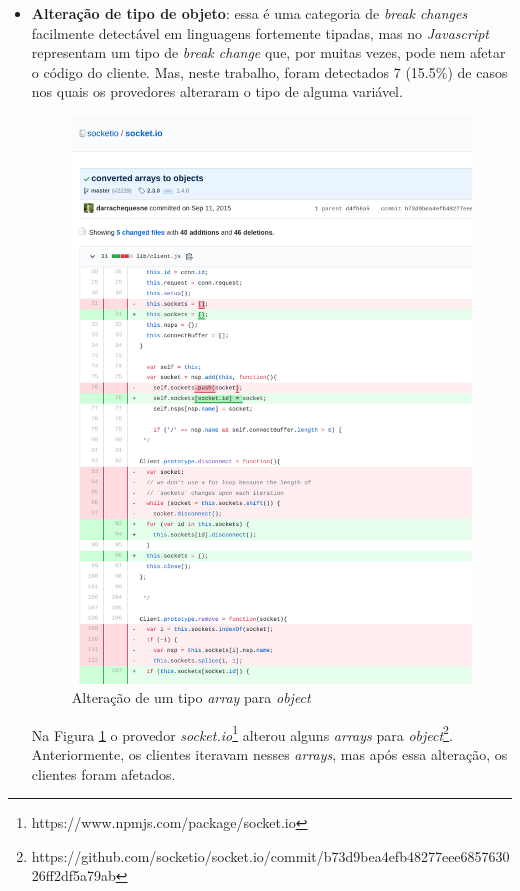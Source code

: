 \begin{itemize}
    \item \textbf{Alteração de tipo de objeto}: essa é uma categoria de \textit{break changes} facilmente detectável em linguagens fortemente tipadas, mas no \textit{Javascript} representam um tipo de \textit{break change} que, por muitas vezes, pode nem afetar o código do cliente. Mas, neste trabalho, foram detectados 7 (15.5\%) de casos nos quais os provedores alteraram o tipo de alguma variável.

    \begin{figure}
        \centering
        \includegraphics[scale=0.9]{figuras/bc_category_change_type.pdf}
        \caption{Alteração de um tipo \textit{array} para \textit{object}}
        \label{fig:bc_category_change_type}
    \end{figure}{}

    Na Figura \ref{fig:bc_category_change_type} o provedor \textit{socket.io}\footnote{https://www.npmjs.com/package/socket.io} alterou alguns \textit{arrays} para \textit{object}\footnote{https://github.com/socketio/socket.io/commit/b73d9bea4efb48277eee685763026ff2df5a79ab}. Anteriormente, os clientes iteravam nesses \textit{arrays}, mas após essa alteração, os clientes foram afetados.


\end{itemize}
